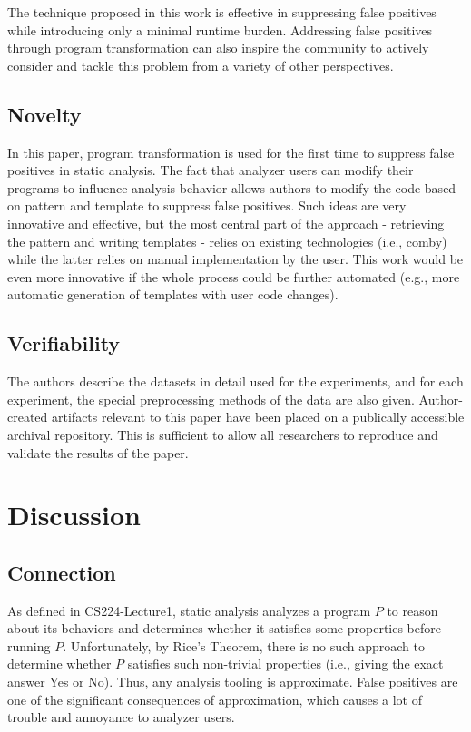 \documentclass[conference]{IEEEtran}
\begin{document}
The technique proposed in this work is effective in suppressing false positives while introducing only a minimal runtime burden. Addressing false positives through program transformation can also inspire the community to actively consider and tackle this problem from a variety of other perspectives.

\subsection{Novelty}
In this paper, program transformation is used for the first time to suppress false positives in static analysis. The fact that analyzer users can modify their programs to influence analysis behavior allows authors to modify the code based on pattern and template to suppress false positives. Such ideas are very innovative and effective, but the most central part of the approach - retrieving the pattern and writing templates - relies on existing technologies (i.e., comby) while the latter relies on manual implementation by the user. This work would be even more innovative if the whole process could be further automated (e.g., more automatic generation of templates with user code changes).

\subsection{Verifiability}
The authors describe the datasets in detail used for the experiments, and for each experiment, the special preprocessing methods of the data are also given. Author-created artifacts relevant to this paper have been placed on a publically accessible archival repository.  This is sufficient to allow all researchers to reproduce and validate the results of the paper.

\section{Discussion}
\subsection{Connection}
As defined in CS224-Lecture1, static analysis analyzes a program $P$ to reason about its behaviors and determines whether it satisfies some properties before running $P$. Unfortunately, by Rice's Theorem, there is no such approach to determine whether $P$ satisfies such non-trivial properties (i.e., giving the exact answer Yes or No). Thus, any analysis tooling is approximate. False positives are one of the significant consequences of approximation, which causes a lot of trouble and annoyance to analyzer users.
\end{document}
